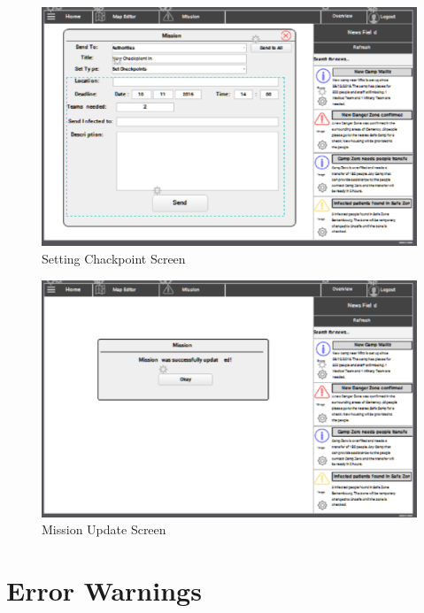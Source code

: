 \begin{figure}[htbp]
\begin{center}
 \caption{\label{fig:W15} Setting Chackpoint Screen}
   \includegraphics[width=150mm]{./images/Web/ccheckpointsc.eps}
\end{center}
\end{figure}
\begin{figure}[htbp]
\begin{center}
 \caption{\label{fig:W14} Mission Update Screen}
   \includegraphics[width=150mm]{./images/Web/cupdatescreen.eps}
\end{center}
\end{figure}


\section{Error Warnings}
\label{sec:ErrorWarnings}

